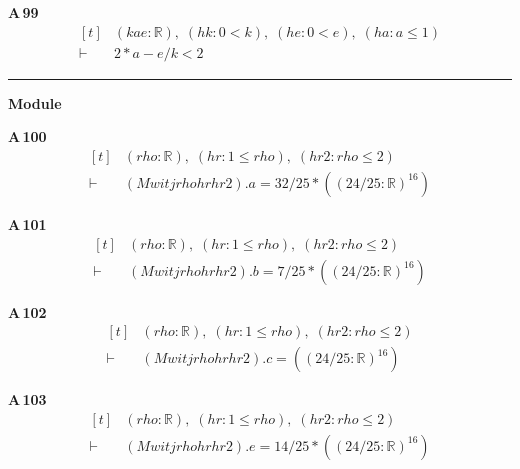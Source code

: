 \noindent\textbf{A\,99}\quad{}
{\footnotesize\[ \begin{aligned}[t]
&(\mathit{k} \mathit{a} \mathit{e} : \mathbb{R} ),\; (\mathit{hk} : 0 < \mathit{k}),\; (\mathit{he} : 0 < \mathit{e}),\; (\mathit{ha} : \mathit{a} \leq 1)\\
\vdash\;&2*\mathit{a}-\mathit{e}/\mathit{k} < 2
\end{aligned} \]}

\vspace{4pt}\noindent\rule{\columnwidth}{0.4pt}\par\vspace{2pt}
\noindent\textbf{Module }\par\vspace{3pt}

\noindent\textbf{A\,100}\quad{}
{\footnotesize\[ \begin{aligned}[t]
&(\mathit{rho} : \mathbb{R} ),\; (\mathit{hr} : 1 \leq \mathit{rho}),\; (\mathit{hr2} : \mathit{rho} \leq 2)\\
\vdash\;&(\mathit{Mwit} \mathit{j} \mathit{rho} \mathit{hr} \mathit{hr2}).\mathit{a} = 32/25*((24/25:\mathbb{R} )^{16})
\end{aligned} \]}

\noindent\textbf{A\,101}\quad{}
{\footnotesize\[ \begin{aligned}[t]
&(\mathit{rho} : \mathbb{R} ),\; (\mathit{hr} : 1 \leq \mathit{rho}),\; (\mathit{hr2} : \mathit{rho} \leq 2)\\
\vdash\;&(\mathit{Mwit} \mathit{j} \mathit{rho} \mathit{hr} \mathit{hr2}).\mathit{b} = 7/25*((24/25:\mathbb{R} )^{16})
\end{aligned} \]}

\noindent\textbf{A\,102}\quad{}
{\footnotesize\[ \begin{aligned}[t]
&(\mathit{rho} : \mathbb{R} ),\; (\mathit{hr} : 1 \leq \mathit{rho}),\; (\mathit{hr2} : \mathit{rho} \leq 2)\\
\vdash\;&(\mathit{Mwit} \mathit{j} \mathit{rho} \mathit{hr} \mathit{hr2}).\mathit{c} = ((24/25:\mathbb{R} )^{16})
\end{aligned} \]}

\noindent\textbf{A\,103}\quad{}
{\footnotesize\[ \begin{aligned}[t]
&(\mathit{rho} : \mathbb{R} ),\; (\mathit{hr} : 1 \leq \mathit{rho}),\; (\mathit{hr2} : \mathit{rho} \leq 2)\\
\vdash\;&(\mathit{Mwit} \mathit{j} \mathit{rho} \mathit{hr} \mathit{hr2}).\mathit{e} = 14/25*((24/25:\mathbb{R} )^{16})
\end{aligned} \]}

